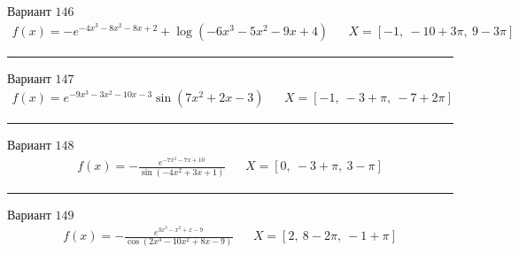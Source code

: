\documentclass[11pt]{report}
\begin{document}
Вариант \(146\)
\begin{align*}
    f(x) = - e^{- 4 x^{3} - 8 x^{2} - 8 x + 2} + \log{\left(- 6 x^{3} - 5 x^{2} - 9 x + 4 \right)} && X = \left[ -1, \  -10 + 3 \pi, \  9 - 3 \pi\right]
\end{align*}
\begin{center}
    \noindent\rule{8cm}{0.4pt}
\end{center}
Вариант \(147\)
\begin{align*}
    f(x) = e^{- 9 x^{3} - 3 x^{2} - 10 x - 3} \sin{\left(7 x^{2} + 2 x - 3 \right)} && X = \left[ -1, \  -3 + \pi, \  -7 + 2 \pi\right]
\end{align*}
\begin{center}
    \noindent\rule{8cm}{0.4pt}
\end{center}
Вариант \(148\)
\begin{align*}
    f(x) = - \frac{e^{- 7 x^{2} - 7 x + 10}}{\sin{\left(- 4 x^{2} + 3 x + 1 \right)}} && X = \left[ 0, \  -3 + \pi, \  3 - \pi\right]
\end{align*}
\begin{center}
    \noindent\rule{8cm}{0.4pt}
\end{center}
Вариант \(149\)
\begin{align*}
    f(x) = - \frac{e^{3 x^{3} - x^{2} + x - 9}}{\cos{\left(2 x^{3} - 10 x^{2} + 8 x - 9 \right)}} && X = \left[ 2, \  8 - 2 \pi, \  -1 + \pi\right]
\end{align*}
\end{document}
